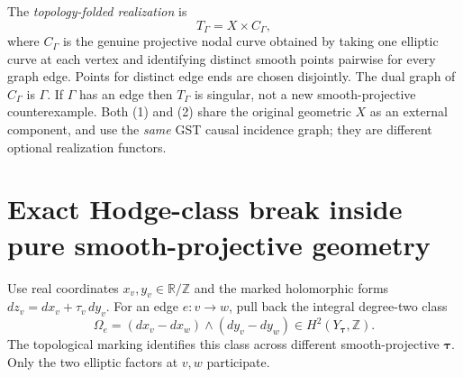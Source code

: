 \documentclass[11pt]{article}
\begin{document}
The \emph{topology-folded realization} is
\[
 T_\Gamma=X\times C_\Gamma,                             \tag{2}
\]
where $C_\Gamma$ is the genuine projective nodal curve obtained
by taking one elliptic curve at each vertex and identifying
distinct smooth points pairwise for every graph edge.
Points for distinct edge ends are chosen disjointly.
The dual graph of $C_\Gamma$ is $\Gamma$.
If $\Gamma$ has an edge then $T_\Gamma$ is singular, not a
new smooth-projective counterexample. Both (1) and (2)
share the original geometric $X$ as an external
component, and use the \emph{same} GST causal incidence graph;
they are different optional realization functors.

\section{Exact Hodge-class break inside pure smooth-projective geometry}
Use real coordinates $x_v,y_v\in\mathbb R/\mathbb Z$
and the marked holomorphic forms
$dz_v=dx_v+\tau_v\,dy_v$.
For an edge $e:v\to w$, pull back the integral degree-two class
\[
 \boxed{
 \Omega_e=(dx_v-dx_w)\wedge(dy_v-dy_w)
      \in H^2(Y_{\boldsymbol\tau},\mathbb Z).
 }                                                            \tag{3}
\]
The topological marking identifies this class across
different smooth-projective $\boldsymbol\tau$.
Only the two elliptic factors at $v,w$ participate.
\end{document}
